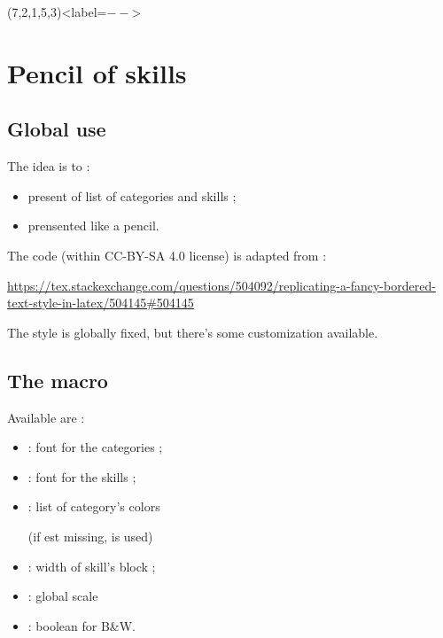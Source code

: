 \documentclass[english,11pt,a4paper]{article}
\begin{document}
(7,2,1,5,3)<label=$--$>

\pagebreak

\section{Pencil of skills}

\subsection{Global use}

The idea is to :

\begin{itemize}
	\item present of list of categories and skills ;
	\item prensented like a pencil.
\end{itemize}

The code (within CC-BY-SA 4.0 license) is adapted from :

\hfill{\footnotesize \url{https://tex.stackexchange.com/questions/504092/replicating-a-fancy-bordered-text-style-in-latex/504145#504145}}\hfill~

\begin{codehigh}[language=latex/latex3,style/main=teal!25,style/code=teal!25]
\end{codehigh}

The style is globally fixed, but there's some customization available.

\subsection{The macro}

Available  are :

\begin{itemize}
	\item {} : font for the categories ;
	\item {} : font for the skills ;
	\item {} : list of category's colors
	
	
	(if  est missing,  is used)
	\item {} : width of skill's block ;
	\item {} : global scale
	\item {} : boolean for B\&W.
\end{itemize}
\end{document}
